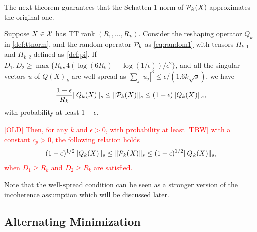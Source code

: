 The next theorem guarantees that the Schatten-1 norm of $\mathcal{P}_k(X)$
approximates the original one.
% 
\begin{theorem} \label{thm:random} Suppose $X\in\mathcal{X}$ has TT rank
  $(R_1, \ldots,R_k)$.  Consider the reshaping operator $Q_k$ in
  \eqref{def:ttnorm}, and the random operator $\mathcal{P}_k$ as
  \eqref{eq:random1} with tensors $\Pi_{k,1}$ and $\Pi_{k,2}$ defined
  as \eqref{def:pi}.  
  If $D_1, D_2 \ge \max\{ R_k, 4 (\log(6 R_k) + \log(1 / \epsilon))/\epsilon^2 \}$, and all the singular vectors $u$ of $Q(X)_k$ are well-spread as
  $ \sum_j |u_j|^3 \le \epsilon/(1.6 k \sqrt{s})$, we have
  \begin{align*}
      \frac{1-\epsilon}{R_k} \|Q_k(X)\|_{s} \leq \| \mathcal{P}_k (X)\|_{s} \leq (1+\epsilon) \|Q_k(X)\|_{s},
  \end{align*}
  with probability at least $1 - \epsilon$.

    \textcolor{red}{ [OLD]
    Then, for any $k$ and $\epsilon > 0$, with probability at least [TBW] with a constant $c_{p} > 0$, the following relation holds
    \begin{align*}
        (1-\epsilon)^{1/2}\|Q_k(X)\|_{s} \leq \| \mathcal{P}_k (X)\|_{s} \leq (1+\epsilon)^{1/2}\|Q_k(X)\|_{s},
    \end{align*}
    when $D_1 \geq R_k$ and $D_2 \geq R_k$ are satisfied.
    }
    \fi
\end{theorem}

Note that the well-spread condition can be seen as a stronger version of the incoherence assumption which will be discussed later.



\subsection{Alternating Minimization}


